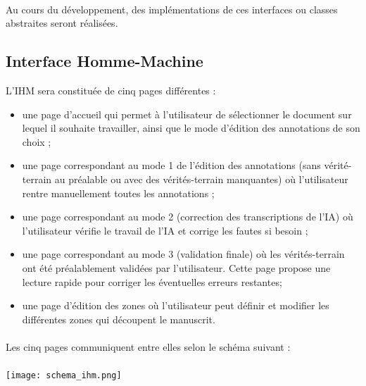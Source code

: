 \paragraph{}

Au cours du développement, des implémentations de ces interfaces ou classes abstraites seront réalisées.

\subsection{Interface Homme-Machine}

L’IHM sera constituée de cinq pages différentes :
\begin{itemize}
	\item une page d’accueil qui permet à l’utilisateur de sélectionner le document sur lequel il souhaite travailler, ainsi que le mode d’édition des annotations de son choix ;
	\item une page correspondant au mode 1 de l’édition des annotations (sans vérité-terrain au préalable ou avec des vérités-terrain manquantes) où l’utilisateur rentre manuellement toutes les annotations ;
	\item une page correspondant au mode 2 (correction des transcriptions de l’IA) où l’utilisateur vérifie le travail de l’IA et corrige les fautes si besoin ;
	\item une page correspondant au mode 3 (validation finale) où les vérités-terrain ont été préalablement validées par l’utilisateur. Cette page propose une lecture rapide pour corriger les éventuelles erreurs restantes;
	\item une page d’édition des zones où l’utilisateur peut définir et modifier les différentes zones qui découpent le manuscrit.
\end{itemize}

\paragraph{}

Les cinq pages communiquent entre elles selon le schéma suivant :

\paragraph{}

\begin{mdframed}[frametitle={Figure 10 : Organisation de l'IHM}, innerbottommargin=10]
\begin{center}
\texttt{[image: schema\_ihm.png]}
\end{center}
\end{mdframed}

